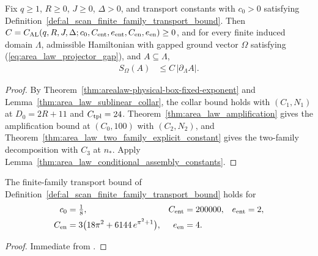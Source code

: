 \begin{lemma}
    \label{thm:area_law_transport_constant}
    \leanok
    Fix $q\ge1$, $R\ge0$, $J\ge0$, $\Delta>0$, and transport constants with $c_0>0$ satisfying Definition~\ref{def:al_scan_finite_family_transport_bound}. Then
    $C=C_{\rm AL}(q,R,J,\Delta;c_0,C_{\rm ent},e_{\rm ent},C_{\rm en},e_{\rm en})\ge0$, and for every finite induced domain $\Lambda$, admissible Hamiltonian with gapped ground vector $\Omega$ satisfying (\ref{eq:area_law_projector_gap}), and $A\subseteq\Lambda$,
    \begin{align}
        S_\Omega(A) & \le C\,|\partial_\Lambda A|.
        \label{eq:area_law_transport_bound_ineq}
    \end{align}
\end{lemma}
\begin{proof}
    \leanok
    By Theorem~\ref{thm:arealaw-physical-box-fixed-exponent} and Lemma~\ref{thm:area_law_sublinear_collar}, the collar bound holds with $(C_1,N_1)$ at $D_0=2R+11$ and $C_{\rm tpl}=24$. Theorem~\ref{thm:area_law_amplification} gives the amplification bound at $(C_0,100)$ with $(C_2,N_2)$, and Theorem~\ref{thm:area_law_two_family_explicit_constant} gives the two-family decomposition with $C_3$ at $n_*$. Apply Lemma~\ref{thm:area_law_conditional_assembly_constants}.
\end{proof}

\begin{lemma}
    \label{thm:area_law_transport_bound_explicit}
    \leanok
    The finite-family transport bound of
    Definition~\ref{def:al_scan_finite_family_transport_bound} holds for
    \begin{align}
        c_0         & =\tfrac18,                               &
        C_{\rm ent} & =200000,                                 &
        e_{\rm ent} & =2, \notag                                 \\
        C_{\rm en}  & =3\bigl(18\pi^2+6144\,e^{\pi^2+1}\bigr), &
        e_{\rm en}  & =4.
        \label{eq:area_law_transport_explicit_values}
    \end{align}
\end{lemma}
\begin{proof}
    \leanok
    Immediate from \cite[Proposition~7.4]{OpenAI2026AreaLaw}.
\end{proof}

